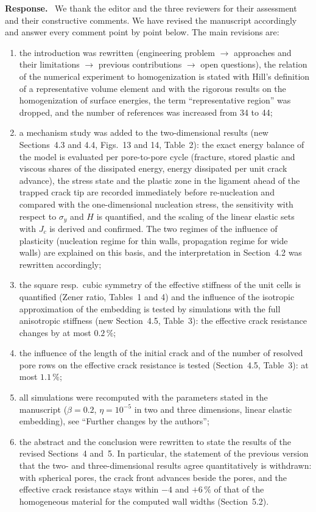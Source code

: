 \documentclass[pdflatex,sn-mathphys-num]{sn-jnl}
\newenvironment{response}
  {\par\noindent\textbf{Response.}\ }
  {\par}
\begin{document}
\begin{response}
We thank the editor and the three reviewers for their assessment and their constructive comments. We have revised the
manuscript accordingly and answer every comment point by point below. The main revisions are:
\begin{enumerate}
\item the introduction was rewritten (engineering problem $\to$ approaches and their limitations $\to$ previous contributions $\to$ open questions), the relation of the numerical experiment to homogenization is stated with Hill's definition of a representative volume element and with the rigorous results on the homogenization of surface energies, the term ``representative region'' was dropped, and the number of references was increased from 34 to 44;
\item a mechanism study was added to the two-dimensional results (new Sections~4.3 and 4.4, Figs.~13 and 14, Table~2): the exact energy balance of the model is evaluated per pore-to-pore cycle (fracture, stored plastic and viscous shares of the dissipated energy, energy dissipated per unit crack advance), the stress state and the plastic zone in the ligament ahead of the trapped crack tip are recorded immediately before re-nucleation and compared with the one-dimensional nucleation stress, the sensitivity with respect to $\sigma_y$ and $H$ is quantified, and the scaling of the linear elastic sets with $J_c$ is derived and confirmed. The two regimes of the influence of plasticity (nucleation regime for thin walls, propagation regime for wide walls) are explained on this basis, and the interpretation in Section~4.2 was rewritten accordingly;
\item the square resp.\ cubic symmetry of the effective stiffness of the unit cells is quantified (Zener ratio, Tables~1 and 4) and the influence of the isotropic approximation of the embedding is tested by simulations with the full anisotropic stiffness (new Section~4.5, Table~3): the effective crack resistance changes by at most $0.2\,\%$;
\item the influence of the length of the initial crack and of the number of resolved pore rows on the effective crack resistance is tested (Section~4.5, Table~3): at most $1.1\,\%$;
\item all simulations were recomputed with the parameters stated in the manuscript ($\beta = 0.2$, $\eta = 10^{-5}$ in two and three dimensions, linear elastic embedding), see ``Further changes by the authors'';
\item the abstract and the conclusion were rewritten to state the results of the revised Sections~4 and~5. In particular, the statement of the previous version that the two- and three-dimensional results agree quantitatively is withdrawn: with spherical pores, the crack front advances beside the pores, and the effective crack resistance stays within $-4$ and $+6\,\%$ of that of the homogeneous material for the computed wall widths (Section~5.2).
\end{enumerate}
\end{response}
\end{document}
